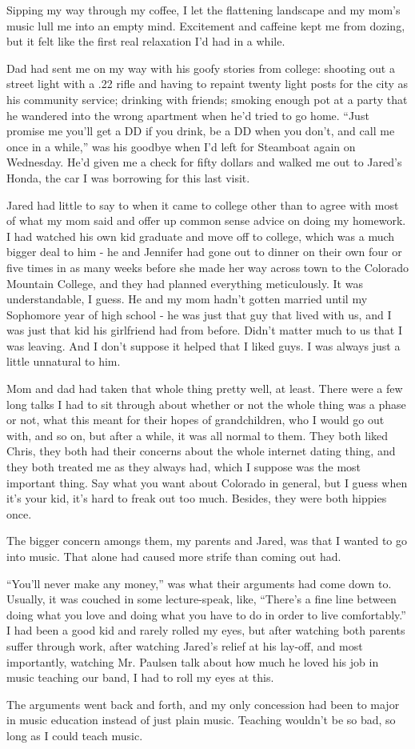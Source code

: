 Sipping my way through my coffee, I let the flattening landscape and my mom's music lull me into an empty mind.  Excitement and caffeine kept me from dozing, but it felt like the first real relaxation I'd had in a while.

Dad had sent me on my way with his goofy stories from college: shooting out a street light with a .22 rifle and having to repaint twenty light posts for the city as his community service; drinking with friends; smoking enough pot at a party that he wandered into the wrong apartment when he'd tried to go home.  ``Just promise me you'll get a DD if you drink, be a DD when you don't, and call me once in a while,'' was his goodbye when I'd left for Steamboat again on Wednesday.  He'd given me a check for fifty dollars and walked me out to Jared's Honda, the car I was borrowing for this last visit.

Jared had little to say to when it came to college other than to agree with most of what my mom said and offer up common sense advice on doing my homework.  I had watched his own kid graduate and move off to college, which was a much bigger deal to him - he and Jennifer had gone out to dinner on their own four or five times in as many weeks before she made her way across town to the Colorado Mountain College, and they had planned everything meticulously.  It was understandable, I guess.  He and my mom hadn't gotten married until my Sophomore year of high school - he was just that guy that lived with us, and I was just that kid his girlfriend had from before.  Didn't matter much to us that I was leaving.  And I don't suppose it helped that I liked guys.  I was always just a little unnatural to him.

Mom and dad had taken that whole thing pretty well, at least.  There were a few long talks I had to sit through about whether or not the whole thing was a phase or not, what this meant for their hopes of grandchildren, who I would go out with, and so on, but after a while, it was all normal to them.  They both liked Chris, they both had their concerns about the whole internet dating thing, and they both treated me as they always had, which I suppose was the most important thing.  Say what you want about Colorado in general, but I guess when it's your kid, it's hard to freak out too much.  Besides, they were both hippies once.

The bigger concern amongs them, my parents and Jared, was that I wanted to go into music.  That alone had caused more strife than coming out had.

``You'll never make any money,'' was what their arguments had come down to.  Usually, it was couched in some lecture-speak, like, ``There's a fine line between doing what you love and doing what you have to do in order to live comfortably.''  I had been a good kid and rarely rolled my eyes, but after watching both parents suffer through work, after watching Jared's relief at his lay-off, and most importantly, watching Mr. Paulsen talk about how much he loved his job in music teaching our band, I had to roll my eyes at this.

The arguments went back and forth, and my only concession had been to major in music education instead of just plain music.  Teaching wouldn't be so bad, so long as I could teach music.
